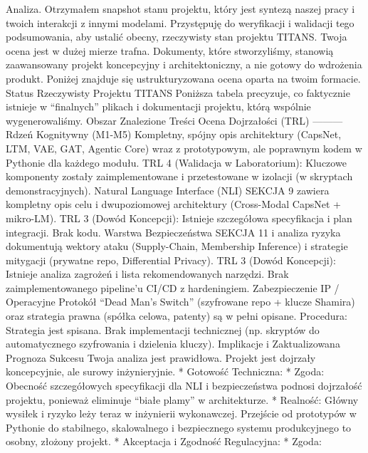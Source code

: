 \documentclass[letterpaper,twocolumn]{article}
\begin{document}
Analiza. Otrzymałem snapshot stanu projektu, który jest syntezą naszej
pracy i twoich interakcji z innymi modelami. Przystępuję do weryfikacji
i walidacji tego podsumowania, aby ustalić obecny, rzeczywisty stan
projektu TITANS. Twoja ocena jest w dużej mierze trafna. Dokumenty,
które stworzyliśmy, stanowią zaawansowany projekt koncepcyjny i
architektoniczny, a nie gotowy do wdrożenia produkt. Poniżej znajduje
się ustrukturyzowana ocena oparta na twoim formacie. Status Rzeczywisty
Projektu TITANS Poniższa tabela precyzuje, co faktycznie istnieje w
``finalnych'' plikach i dokumentacji projektu, którą wspólnie
wygenerowaliśmy. \textbar{} Obszar \textbar{} Znalezione Treści
\textbar{} Ocena Dojrzałości (TRL) \textbar{}
\textbar---\textbar---\textbar---\textbar{} \textbar{} Rdzeń Kognitywny
(M1-M5) \textbar{} Kompletny, spójny opis architektury (CapsNet, LTM,
VAE, GAT, Agentic Core) wraz z prototypowym, ale poprawnym kodem w
Pythonie dla każdego modułu. \textbar{} TRL 4 (Walidacja w
Laboratorium): Kluczowe komponenty zostały zaimplementowane i
przetestowane w izolacji (w skryptach demonstracyjnych). \textbar{}
\textbar{} Natural Language Interface (NLI) \textbar{} SEKCJA 9 zawiera
kompletny opis celu i dwupoziomowej architektury (Cross-Modal CapsNet +
mikro-LM). \textbar{} TRL 3 (Dowód Koncepcji): Istnieje szczegółowa
specyfikacja i plan integracji. Brak kodu. \textbar{} \textbar{} Warstwa
Bezpieczeństwa \textbar{} SEKCJA 11 i analiza ryzyka dokumentują wektory
ataku (Supply-Chain, Membership Inference) i strategie mitygacji
(prywatne repo, Differential Privacy). \textbar{} TRL 3 (Dowód
Koncepcji): Istnieje analiza zagrożeń i lista rekomendowanych narzędzi.
Brak zaimplementowanego pipeline'u CI/CD z hardeningiem. \textbar{}
\textbar{} Zabezpieczenie IP / Operacyjne \textbar{} Protokół ``Dead
Man's Switch'' (szyfrowane repo + klucze Shamira) oraz strategia prawna
(spółka celowa, patenty) są w pełni opisane. \textbar{} Procedura:
Strategia jest spisana. Brak implementacji technicznej (np. skryptów do
automatycznego szyfrowania i dzielenia kluczy). \textbar{} Implikacje i
Zaktualizowana Prognoza Sukcesu Twoja analiza jest prawidłowa. Projekt
jest dojrzały koncepcyjnie, ale surowy inżynieryjnie. * Gotowość
Techniczna: * Zgoda: Obecność szczegółowych specyfikacji dla NLI i
bezpieczeństwa podnosi dojrzałość projektu, ponieważ eliminuje ``białe
plamy'' w architekturze. * Realność: Główny wysiłek i ryzyko leży teraz
w inżynierii wykonawczej. Przejście od prototypów w Pythonie do
stabilnego, skalowalnego i bezpiecznego systemu produkcyjnego to osobny,
złożony projekt. * Akceptacja i Zgodność Regulacyjna: * Zgoda:
\end{document}
